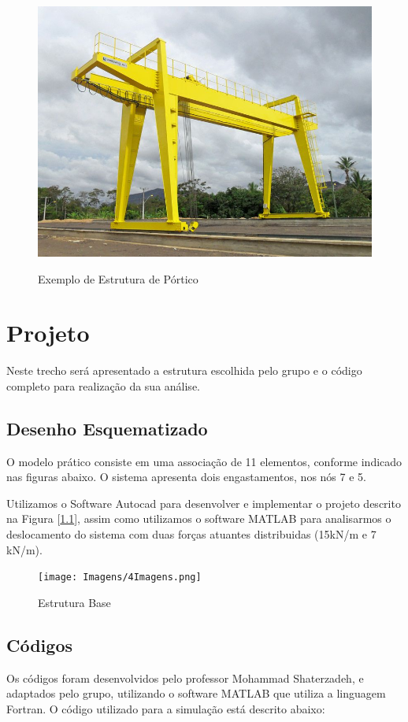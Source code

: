 \documentclass[deposito, acronym, symbols]{fei}
\begin{document}
\begin{figure}[!htb]
 \centering
    \caption{Exemplo de Estrutura de Pórtico}
    \includegraphics[width=0.6\linewidth]{Imagens/Pórtico.png}
    \label{fig: Estrutura Portico}
 \end{figure}

\chapter{Projeto}

Neste trecho será apresentado a estrutura escolhida pelo grupo e o código completo para realização da sua análise.

\section{Desenho Esquematizado}

O modelo prático consiste em uma associação de 11 elementos, conforme indicado nas figuras abaixo. O sistema apresenta dois engastamentos, nos nós 7 e 5. 

Utilizamos o Software Autocad para desenvolver e implementar o projeto descrito na Figura [\ref{fig: Estrutura do Projeto}], assim como utilizamos o software MATLAB para analisarmos o deslocamento do sistema com duas forças atuantes distribuidas (15kN/m e 7 kN/m). 

\begin{figure}[!htb]
 \centering
    \caption{Estrutura Base}
    \texttt{[image: Imagens/4Imagens.png]}
    \label{fig: Estrutura do Projeto}
 \end{figure}

\section{Códigos}

Os códigos foram desenvolvidos pelo professor Mohammad Shaterzadeh, e adaptados pelo grupo, utilizando o software MATLAB que utiliza a linguagem Fortran. O código utilizado para a simulação está descrito abaixo:
\end{document}
